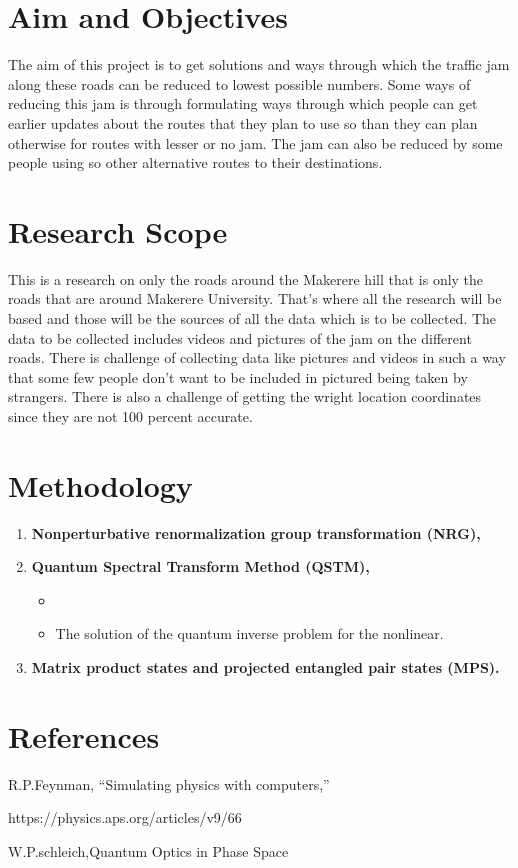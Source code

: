\documentclass[options]{article}
\begin{document}
\section{\textbf{ Aim and Objectives}}
The aim of this project is to get solutions and ways through which the traffic jam along these roads can be reduced to lowest possible numbers.
Some ways of reducing this jam is through formulating ways through which people can get earlier updates about the routes that they plan to use so than they can plan otherwise for routes with lesser or no jam.
The jam can also be reduced by some people using so other alternative routes to their destinations.


\section {\textbf{Research Scope}}
This is a research on only the roads around the Makerere hill that is only the roads that are around Makerere University. That’s where all the research will be based and those will be the sources of all the data which is to be collected. 
The data to be collected includes videos and pictures of the jam on the different roads.
There is challenge of collecting data like pictures and videos in such a way that some few people don’t want to be included in pictured being taken by strangers.
There is also a challenge of getting the wright location coordinates since they are not 100 percent accurate.

\section {\textbf{Methodology}}

\begin{enumerate}
  \item \textbf{Nonperturbative renormalization group transformation (NRG),}


   \item \textbf{Quantum Spectral Transform Method (QSTM), }

\begin{itemize}
   \item 
   \item  The solution of the quantum inverse problem for the nonlinear.
\end{itemize}

   \item \textbf{Matrix product states and projected entangled pair states (MPS).}

\end{enumerate}

\section{\textbf{References}}
R.P.Feynman, “Simulating physics with computers,”

https://physics.aps.org/articles/v9/66 

W.P.schleich,Quantum Optics in Phase Space 
\end{document}
